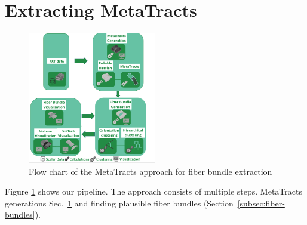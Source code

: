 


\section {Extracting MetaTracts }
\label{sec:approach}

\begin{figure}[tb]
\centering
\includegraphics[width=0.5\textwidth]{imagesMT2014/image3b.png}
\caption{Flow chart of the MetaTracts approach for fiber bundle extraction}
\label{fig:flowchart}
\end{figure}

Figure \ref{fig:flowchart} shows our pipeline. The approach consists of multiple steps. MetaTracts generations Sec.~\ref{sec:approach} and  finding plausible fiber bundles (Section~\ref{subsec:fiber-bundles}).


